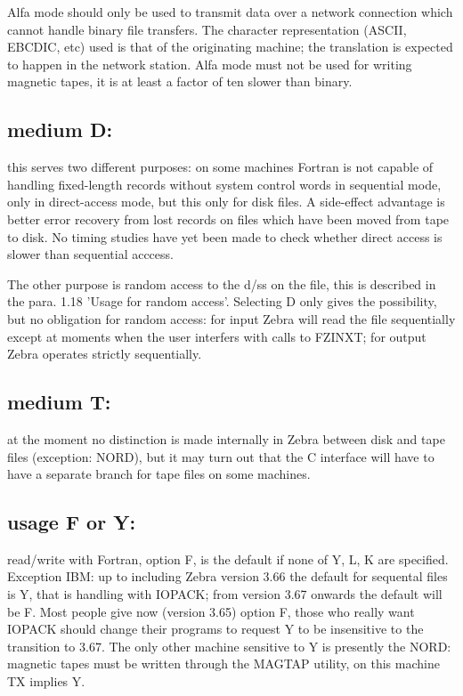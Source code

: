 Alfa mode should only be used to transmit data over a network
connection which cannot handle binary file transfers.
The character representation (ASCII, EBCDIC, etc) used
is that of the originating machine;
the translation is expected to happen in the network station.
Alfa mode must not be used for writing magnetic tapes,
it is at least a factor of ten slower than binary.

\subsection*{medium D:}

this serves two different purposes:
on some machines Fortran is not capable of handling
fixed-length records without system control words in sequential mode,
only in direct-access mode, but this only for disk files.
A side-effect advantage is better error recovery from lost records
on files which have been moved from tape to disk.
No timing studies have yet been made to check whether direct access
is slower than sequential acccess.

The other purpose is random access to the d/ss on the file,
this is described in the para. 1.18 'Usage for random access'.
Selecting D only gives the possibility, but no obligation for
random access: for input Zebra will read the file sequentially
except at moments when the user interfers with calls to FZINXT;
for output Zebra operates strictly sequentially.

\subsection*{medium T:}

at the moment no distinction is made internally in Zebra between
disk and tape files (exception: NORD),
but it may turn out that the C interface will have to have
a separate branch for tape files on some machines.

\subsection*{usage F or Y:}

read/write with Fortran, option F, is the default if none of Y, L, K
are specified.
Exception IBM: up to including Zebra version 3.66 the default
for sequental files is Y, that is handling with IOPACK;
from version 3.67 onwards the default will be F.
Most people give now (version 3.65) option F,
those who really want IOPACK should change their programs to
request Y to be insensitive to the transition to 3.67.
The only other machine sensitive to Y is presently the NORD:
magnetic tapes must be written through the MAGTAP utility,
on this machine TX implies Y.


